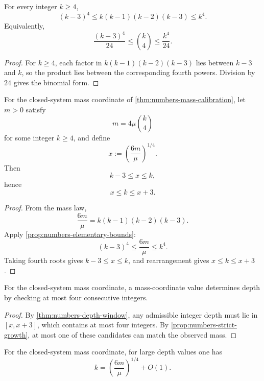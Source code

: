 \begin{proposition}
\label{prop:numbers-elementary-bounds}
For every integer \(k\ge4\),
\[
  (k-3)^4
  \le
  k(k-1)(k-2)(k-3)
  \le
  k^4.
\]
Equivalently,
\[
  \frac{(k-3)^4}{24}
  \le
  \binom{k}{4}
  \le
  \frac{k^4}{24}.
\]
\end{proposition}

\begin{proof}
For \(k\ge4\), each factor in
\(k(k-1)(k-2)(k-3)\)
lies between \(k-3\) and \(k\), so the product lies between the
corresponding fourth powers.
Division by \(24\) gives the binomial form.
\end{proof}

\begin{theorem}
\label{thm:numbers-depth-window}
For the closed-system mass coordinate of \cref{thm:numbers-mass-calibration}, let
\(m>0\) satisfy
\[
  m=4\mu\binom{k}{4}
\]
for some integer \(k\ge4\), and define
\[
  x:=\left(\frac{6m}{\mu}\right)^{1/4}.
\]
Then
\[
  k-3\le x\le k,
\]
hence
\[
  x\le k\le x+3.
\]
\end{theorem}

\begin{proof}
From the mass law,
\[
  \frac{6m}{\mu}=k(k-1)(k-2)(k-3).
\]
Apply \cref{prop:numbers-elementary-bounds}:
\[
  (k-3)^4\le \frac{6m}{\mu}\le k^4.
\]
Taking fourth roots gives
\(k-3\le x\le k\), and rearrangement gives
\(x\le k\le x+3\).
\end{proof}

\begin{corollary}
\label{cor:numbers-finite-candidate-inversion}
For the closed-system mass coordinate, a mass-coordinate value
determines depth by checking at most four consecutive integers.
\end{corollary}

\begin{proof}
By \cref{thm:numbers-depth-window}, any admissible integer depth must lie in
\([x,x+3]\), which contains at most four integers.
By \cref{prop:numbers-strict-growth}, at most one of these candidates can
match the observed mass.
\end{proof}

\begin{proposition}
\label{prop:numbers-asymptotic-depth}
For the closed-system mass coordinate, for large depth values one has
\[
  k
  =
  \left(\frac{6m}{\mu}\right)^{1/4}
  +O(1).
\]
\end{proposition}

